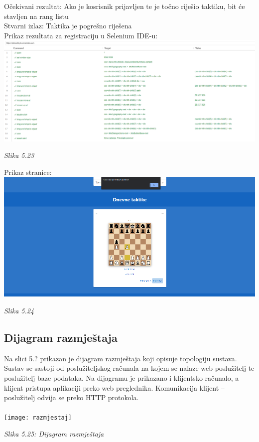 \documentclass{article}
\begin{document}
	Očekivani rezultat: Ako je kosrisnik prijavljen te je točno riješio taktiku, bit će stavljen na rang listu \\
	Stvarni izlaz: Taktika je pogrešno riješena\\
	
	Prikaz rezultata za registraciju u Selenium IDE-u:\\
	
	\includegraphics[width=\columnwidth]{dnevnaTaktika}
	\begin{center}
		\textit{Slika 5.23}
	\end{center}
	\eject
	Prikaz stranice:\\
	
	\includegraphics[width=\columnwidth]{taktika}
	\begin{center}
		\textit{Slika 5.24}
	\end{center}
	\eject
	
	
	
	\subsection{Dijagram razmještaja}
	Na slici 5.? prikazan je dijagram razmještaja koji opisuje topologiju sustava. Sustav se sastoji od poslužiteljskog računala na kojem se nalaze web poslužitelj te poslužitelj baze podataka. Na dijagramu je prikazano i klijentsko računalo, a klijent pristupa aplikaciji preko web preglednika. Komunikacija klijent – poslužitelj odvija se preko HTTP protokola.\\
	\\
	\texttt{[image: razmjestaj]}
	\begin{center}
		\textit{Slika 5.25: Dijagram razmještaja}
	\end{center}
	\eject
\end{document}
